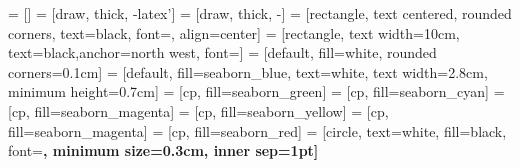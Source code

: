 \usepackage[T1]{fontenc}
\usepackage{helvet}
\renewcommand{\familydefault}{\sfdefault}
\usepackage{amsmath,amssymb}
\usepackage{xcolor}

\usepackage{tikz}
\usetikzlibrary{positioning,shapes,arrows,backgrounds,fit,calc,external,trees,tikzmark}
 = []
 = [draw, thick, -latex']
 = [draw, thick, -]
    = [rectangle, text centered, rounded corners, text=black, font=\sffamily\footnotesize, align=center]
    = [rectangle, text width=10cm, text=black,anchor=north west, font=\sffamily]
 = [default, fill=white, rounded corners=0.1cm]
    = [default, fill=seaborn_blue, text=white, text width=2.8cm, minimum height=0.7cm]
    = [cp, fill=seaborn_green]
    = [cp, fill=seaborn_cyan]
    = [cp, fill=seaborn_magenta]
    = [cp, fill=seaborn_yellow]
    = [cp, fill=seaborn_magenta]
    = [cp, fill=seaborn_red]
 = [circle, text=white, fill=black, font=\sffamily\tiny\bfseries, minimum size=0.3cm, inner sep=1pt]
\newlength{\myyshift}
\setlength{\myyshift}{0.05cm}
